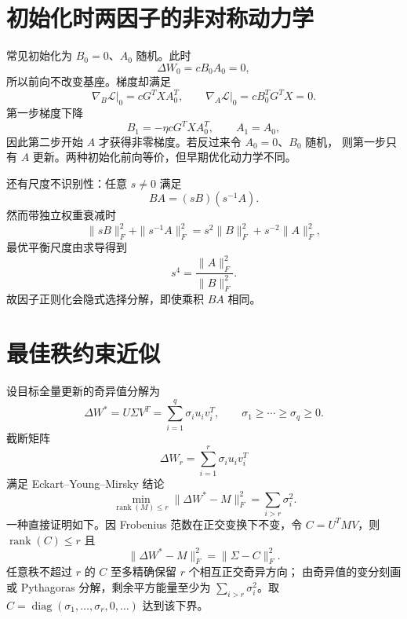 \documentclass[11pt]{article}
\numberwithin{equation}{section}
\newcommand{\1}{\mathbf{1}}
\newcommand{\cL}{\mathcal{L}}
\newcommand{\diag}{\operatorname{diag}}
\begin{document}
\section{初始化时两因子的非对称动力学}

常见初始化为 $B_0=0$、$A_0$ 随机。此时
\begin{equation}
 \Delta W_0=cB_0A_0=0,
\end{equation}
所以前向不改变基座。梯度却满足
\begin{equation}
 \nabla_B\cL\big|_{0}=cG^TXA_0^T,\qquad
 \nabla_A\cL\big|_{0}=cB_0^TG^TX=0.
\end{equation}
第一步梯度下降
\begin{equation}
 B_1=-\eta cG^TXA_0^T,\qquad A_1=A_0,
\end{equation}
因此第二步开始 $A$ 才获得非零梯度。若反过来令 $A_0=0$、$B_0$ 随机，
则第一步只有 $A$ 更新。两种初始化前向等价，但早期优化动力学不同。

还有尺度不识别性：任意 $s\ne0$ 满足
\begin{equation}
 BA=(sB)(s^{-1}A).
\end{equation}
然而带独立权重衰减时
\begin{equation}
 \|sB\|_F^2+\|s^{-1}A\|_F^2
 =s^2\|B\|_F^2+s^{-2}\|A\|_F^2,
\end{equation}
最优平衡尺度由求导得到
\begin{equation}
 s^4=\frac{\|A\|_F^2}{\|B\|_F^2}.
\end{equation}
故因子正则化会隐式选择分解，即使乘积 $BA$ 相同。

\section{最佳秩约束近似}

设目标全量更新的奇异值分解为
\begin{equation}
 \Delta W^*=U\Sigma V^T
 =\sum_{i=1}^{q}\sigma_i u_iv_i^T,
 \qquad\sigma_1\ge\cdots\ge\sigma_q\ge0.
\end{equation}
截断矩阵
\begin{equation}
 \Delta W_r=\sum_{i=1}^{r}\sigma_i u_iv_i^T
\end{equation}
满足 Eckart--Young--Mirsky 结论
\begin{equation}
 \min_{\operatorname{rank}(M)\le r}
 \|\Delta W^*-M\|_F^2
 =\sum_{i>r}\sigma_i^2.
\end{equation}
一种直接证明如下。因 Frobenius 范数在正交变换下不变，令
$C=U^TMV$，则 $\operatorname{rank}(C)\le r$ 且
\begin{equation}
 \|\Delta W^*-M\|_F^2=\|\Sigma-C\|_F^2.
\end{equation}
任意秩不超过 $r$ 的 $C$ 至多精确保留 $r$ 个相互正交奇异方向；
由奇异值的变分刻画或 Pythagoras 分解，剩余平方能量至少为
$\sum_{i>r}\sigma_i^2$。取
$C=\diag(\sigma_1,\ldots,\sigma_r,0,\ldots)$ 达到该下界。
\end{document}
